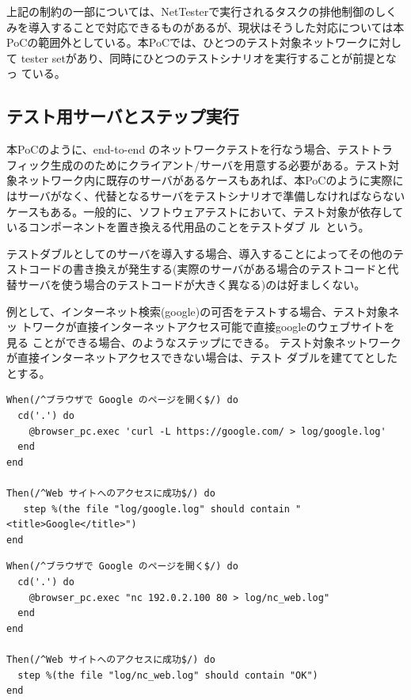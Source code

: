 上記の制約の一部については、NetTesterで実行されるタスクの排他制御のしく
みを導入することで対応できるものがあるが、現状はそうした対応については本
PoCの範囲外としている。本PoCでは、ひとつのテスト対象ネットワークに対して
tester setがあり、同時にひとつのテストシナリオを実行することが前提となっ
ている。

  \subsection{テスト用サーバとステップ実行}
本PoCのように、end-to-end のネットワークテストを行なう場合、テストトラ
フィック生成ののためにクライアント/サーバを用意する必要がある。テスト対
象ネットワーク内に既存のサーバがあるケースもあれば、本PoCのように実際に
はサーバがなく、代替となるサーバをテストシナリオで準備しなければならない
ケースもある。一般的に、ソフトウェアテストにおいて、テスト対象が依存して
いるコンポーネントを置き換える代用品のことをテストダブ
ル~\cite{test-double}という。

テストダブルとしてのサーバを導入する場合、導入することによってその他のテ
ストコードの書き換えが発生する(実際のサーバがある場合のテストコードと代
替サーバを使う場合のテストコードが大きく異なる)のは好ましくない。

例として、インターネット検索(google)の可否をテストする場合、テスト対象ネッ
トワークが直接インターネットアクセス可能で直接googleのウェブサイトを見る
ことができる場合、のようなステップにできる。
テスト対象ネットワークが直接インターネットアクセスできない場合は、テスト
ダブルを建ててとしたとする。

\begin{lstlisting}[caption=実際のサービスを利用する場合,label=lst:real-service-test]
When(/^ブラウザで Google のページを開く$/) do
  cd('.') do
    @browser_pc.exec 'curl -L https://google.com/ > log/google.log'
  end
end

Then(/^Web サイトへのアクセスに成功$/) do
   step %(the file "log/google.log" should contain "<title>Google</title>")
end
\end{lstlisting}

\begin{lstlisting}[caption=テストダブルを利用する場合,label=lst:testdouble-test]
When(/^ブラウザで Google のページを開く$/) do
  cd('.') do
    @browser_pc.exec "nc 192.0.2.100 80 > log/nc_web.log"
  end
end

Then(/^Web サイトへのアクセスに成功$/) do
  step %(the file "log/nc_web.log" should contain "OK")
end
\end{lstlisting}


